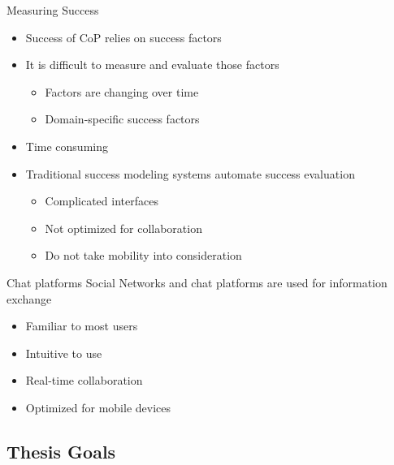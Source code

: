 \begin{frame}{Measuring Success}
  \begin{itemize}
    \item Success of CoP relies on success factors
    \item It is difficult to measure and evaluate those factors
          \begin{itemize}
            \item Factors are changing over time \cite{Renz16}
            \item Domain-specific success factors
          \end{itemize}
    \item Time consuming
    \item Traditional success modeling systems automate success evaluation
          \begin{itemize}
            \item Complicated interfaces
            \item Not optimized for collaboration
            \item Do not take mobility into consideration \cite{Renz16}
          \end{itemize}
  \end{itemize}
\end{frame}

\begin{frame}{Chat platforms}
  Social Networks and chat platforms are used for information exchange
  \begin{itemize}
    \item Familiar to most users
    \item Intuitive to use
    \item Real-time collaboration
    \item Optimized for mobile devices
  \end{itemize}
\end{frame}


\subsection{Thesis Goals}

